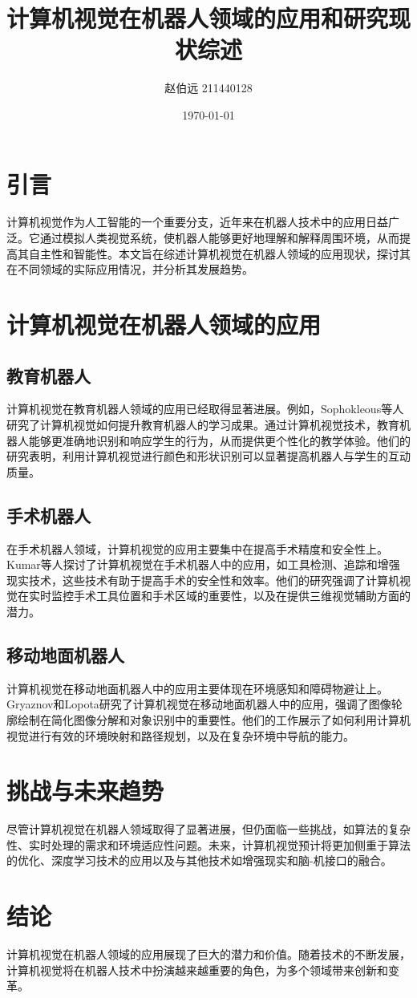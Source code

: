 \documentclass[UTF8,titlepage]{article}
\title{计算机视觉在机器人领域的应用和研究现状综述}
\author{赵伯远 211440128}
\date{\today}
\numberwithin{figure}{section}
\begin{document}
\maketitle
\section{引言}
计算机视觉作为人工智能的一个重要分支，近年来在机器人技术中的应用日益广泛。它通过模拟人类视觉系统，使机器人能够更好地理解和解释周围环境，从而提高其自主性和智能性。本文旨在综述计算机视觉在机器人领域的应用现状，探讨其在不同领域的实际应用情况，并分析其发展趋势。

\section{计算机视觉在机器人领域的应用}
\subsection{教育机器人}
计算机视觉在教育机器人领域的应用已经取得显著进展。例如，Sophokleous等人\cite{sophokleous2021educational}研究了计算机视觉如何提升教育机器人的学习成果。通过计算机视觉技术，教育机器人能够更准确地识别和响应学生的行为，从而提供更个性化的教学体验。他们的研究表明，利用计算机视觉进行颜色和形状识别可以显著提高机器人与学生的互动质量。

\subsection{手术机器人}
在手术机器人领域，计算机视觉的应用主要集中在提高手术精度和安全性上。Kumar等人\cite{kumar2015surgical}探讨了计算机视觉在手术机器人中的应用，如工具检测、追踪和增强现实技术，这些技术有助于提高手术的安全性和效率。他们的研究强调了计算机视觉在实时监控手术工具位置和手术区域的重要性，以及在提供三维视觉辅助方面的潜力。

\subsection{移动地面机器人}
计算机视觉在移动地面机器人中的应用主要体现在环境感知和障碍物避让上。Gryaznov和Lopota\cite{kennedy2021operating}研究了计算机视觉在移动地面机器人中的应用，强调了图像轮廓绘制在简化图像分解和对象识别中的重要性。他们的工作展示了如何利用计算机视觉进行有效的环境映射和路径规划，以及在复杂环境中导航的能力。

\section{挑战与未来趋势}
尽管计算机视觉在机器人领域取得了显著进展，但仍面临一些挑战，如算法的复杂性、实时处理的需求和环境适应性问题。未来，计算机视觉预计将更加侧重于算法的优化、深度学习技术的应用以及与其他技术如增强现实和脑-机接口的融合。

\section{结论}
计算机视觉在机器人领域的应用展现了巨大的潜力和价值。随着技术的不断发展，计算机视觉将在机器人技术中扮演越来越重要的角色，为多个领域带来创新和变革。



\vspace{12pt}
\end{document}
